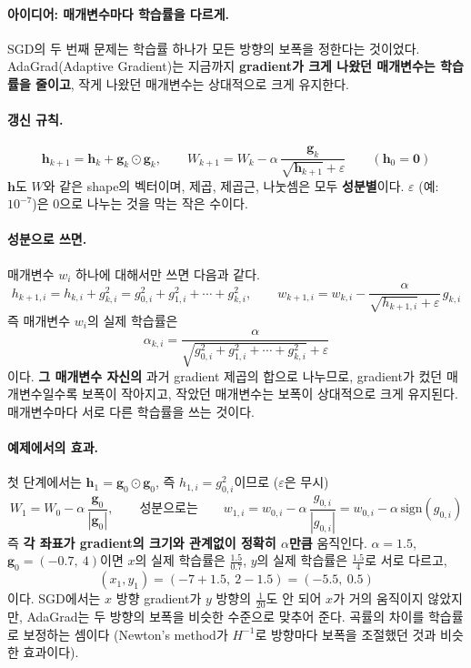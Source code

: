 \documentclass[11pt,a4paper]{article}
\begin{document}
\paragraph{아이디어: 매개변수마다 학습률을 다르게.}
SGD의 두 번째 문제는 학습률 하나가 모든 방향의 보폭을 정한다는 것이었다.
AdaGrad(Adaptive Gradient)는 지금까지 \textbf{gradient가 크게 나왔던 매개변수는 학습률을 줄이고},
작게 나왔던 매개변수는 상대적으로 크게 유지한다.

\paragraph{갱신 규칙.}
\[
\boxed{
\bm h_{k+1}=\bm h_k+\bm g_k\odot\bm g_k,
\qquad
W_{k+1}=W_k-\alpha\,\frac{\bm g_k}{\sqrt{\bm h_{k+1}}+\varepsilon}
}
\qquad(\bm h_0=\bm 0)
\]
$\bm h$도 $W$와 같은 shape의 벡터이며, 제곱, 제곱근, 나눗셈은 모두 \textbf{성분별}이다.
$\varepsilon$ (예: $10^{-7}$)은 $0$으로 나누는 것을 막는 작은 수이다.

\paragraph{성분으로 쓰면.}
매개변수 $w_i$ 하나에 대해서만 쓰면 다음과 같다.
\[
h_{k+1,i}=h_{k,i}+g_{k,i}^2=g_{0,i}^2+g_{1,i}^2+\cdots+g_{k,i}^2,
\qquad
w_{k+1,i}=w_{k,i}-\frac{\alpha}{\sqrt{h_{k+1,i}}+\varepsilon}\,g_{k,i}
\]
즉 매개변수 $w_i$의 실제 학습률은
\[
\alpha_{k,i}=\frac{\alpha}{\sqrt{g_{0,i}^2+g_{1,i}^2+\cdots+g_{k,i}^2}+\varepsilon}
\]
이다. \textbf{그 매개변수 자신의} 과거 gradient 제곱의 합으로 나누므로,
gradient가 컸던 매개변수일수록 보폭이 작아지고, 작았던 매개변수는 보폭이 상대적으로 크게 유지된다.
매개변수마다 서로 다른 학습률을 쓰는 것이다.

\paragraph{예제에서의 효과.}
첫 단계에서는 $\bm h_1=\bm g_0\odot\bm g_0$, 즉 $h_{1,i}=g_{0,i}^2$이므로 ($\varepsilon$은 무시)
\[
W_1=W_0-\alpha\,\frac{\bm g_0}{|\bm g_0|},
\qquad\text{성분으로는}\qquad
w_{1,i}=w_{0,i}-\alpha\,\frac{g_{0,i}}{|g_{0,i}|}=w_{0,i}-\alpha\,\mathrm{sign}(g_{0,i})
\]
즉 \textbf{각 좌표가 gradient의 크기와 관계없이 정확히 $\alpha$만큼} 움직인다.
$\alpha=1.5$, $\bm g_0=(-0.7,\ 4)$이면 $x$의 실제 학습률은 $\frac{1.5}{0.7}$, $y$의 실제 학습률은 $\frac{1.5}{4}$로 서로 다르고,
\[
(x_1,y_1)=(-7+1.5,\ 2-1.5)=(-5.5,\ 0.5)
\]
이다. SGD에서는 $x$ 방향 gradient가 $y$ 방향의 $\frac{1}{20}$도 안 되어 $x$가 거의 움직이지 않았지만,
AdaGrad는 두 방향의 보폭을 비슷한 수준으로 맞추어 준다.
곡률의 차이를 학습률로 보정하는 셈이다
(Newton's method가 $H^{-1}$로 방향마다 보폭을 조절했던 것과 비슷한 효과이다).
\end{document}
